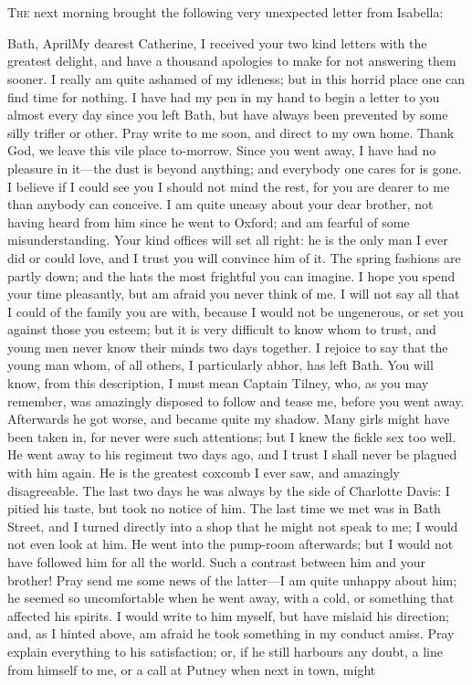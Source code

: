 \chapter[Chapter \thechapter]{} 

 \lettrine{T}{he} next morning brought the following very unexpected letter from Isabella: 
 
 \vspace{2em}
 \begin{mail}{Bath, April}{My dearest Catherine,}
I received your two kind letters with the greatest delight, and have a thousand apologies to make for not answering them sooner. I really am quite ashamed of my idleness; but in this horrid place one can find time for nothing. I have had my pen in my hand to begin a letter to you almost every day since you left Bath, but have always been prevented by some silly trifler or other. Pray write to me soon, and direct to my own home. Thank God, we leave this vile place to-morrow. Since you went away, I have had no pleasure in it—the dust is beyond anything; and everybody one cares for is gone. I believe if I could see you I should not mind the rest, for you are dearer to me than anybody can conceive. I am quite uneasy about your dear brother, not having heard from him since he went to Oxford; and am fearful of some misunderstanding. Your kind offices will set all right: he is the only man I ever did or could love, and I trust you will convince him of it. The spring fashions are partly down; and the hats the most frightful you can imagine. I hope you spend your time pleasantly, but am afraid you never think of me. I will not say all that I could of the family you are with, because I would not be ungenerous, or set you against those you esteem; but it is very difficult to know whom to trust, and young men never know their minds two days together. I rejoice to say that the young man whom, of all others, I particularly abhor, has left Bath. You will know, from this description, I must mean Captain Tilney, who, as you may remember, was amazingly disposed to follow and tease me, before you went away. Afterwards he got worse, and became quite my shadow. Many girls might have been taken in, for never were such attentions; but I knew the fickle sex too well. He went away to his regiment two days ago, and I trust I shall never be plagued with him again. He is the greatest coxcomb I ever saw, and amazingly disagreeable. The last two days he was always by the side of Charlotte Davis: I pitied his taste, but took no notice of him. The last time we met was in Bath Street, and I turned directly into a shop that he might not speak to me; I would not even look at him. He went into the pump-room afterwards; but I would not have followed him for all the world. Such a contrast between him and your brother! Pray send me some news of the latter—I am quite unhappy about him; he seemed so uncomfortable when he went away, with a cold, or something that affected his spirits. I would write to him myself, but have mislaid his direction; and, as I hinted above, am afraid he took something in my conduct amiss. Pray explain everything to his satisfaction; or, if he still harbours any doubt, a line from himself to me, or a call at Putney when next in town, might 
\end{mail}

